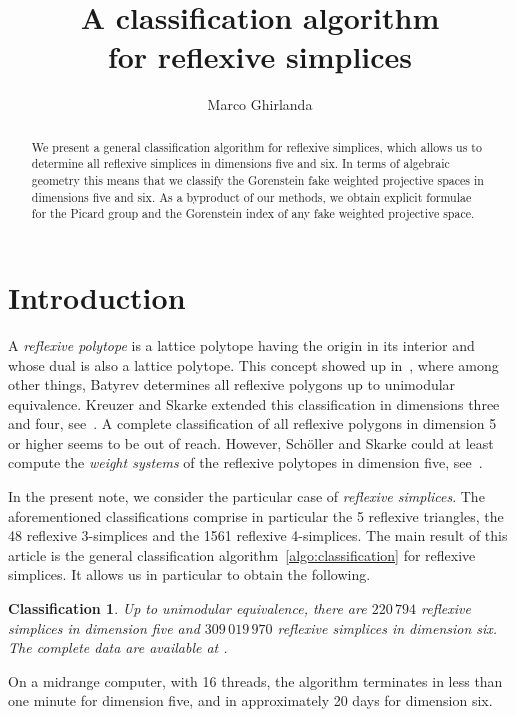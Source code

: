 \documentclass{amsart}
\title[A classification algorithm for reflexive simplices]{A classification algorithm\\ for reflexive simplices}
\author{Marco Ghirlanda}
\date{}
\newtheorem{classification}[lem]{Classification}
\theoremstyle{definition}
\begin{document}
\begin{abstract}
    We present a general classification algorithm for reflexive simplices,
    which allows us to determine all reflexive simplices in dimensions
    five and six.
    In terms of algebraic geometry this means that we classify the
    Gorenstein fake weighted projective spaces in dimensions five and six.
    As a byproduct of our methods, we obtain explicit formulae for the
    Picard group and the Gorenstein index of any fake weighted
    projective space.
\end{abstract}

\maketitle



\section{Introduction}

A \emph{reflexive polytope} is a lattice polytope having the origin
in its interior and whose dual is also a lattice polytope.
This concept showed up in~\cite{B}, where among other things,
Batyrev determines all reflexive polygons up to unimodular
equivalence.
Kreuzer and Skarke extended this classification in dimensions three
and four, see~\cites{KS3,KS4}. 
A complete classification of all reflexive polygons in dimension 5
or higher seems to be out of reach.
However, Sch\"oller and Skarke could at least compute the 
\emph{weight systems} of the reflexive polytopes in dimension
five, see~\cite{SS}.

In the present note, we consider the particular case of
\emph{reflexive simplices}.
The aforementioned classifications comprise in particular the
5 reflexive triangles, the 48 reflexive 3-simplices and the
1561 reflexive 4-simplices.
The main result of this article is the general classification
algorithm~\ref{algo:classification} for reflexive simplices.
It allows us in particular to obtain the following.

\begin{classification}\label{class:reflexive}
Up to unimodular equivalence, there are $220 \, 794$ reflexive simplices
in dimension five and $309 \, 019 \, 970$ reflexive simplices in dimension six.
The complete data are available at \cite{zenodo:17296449}.
\end{classification}

On a midrange computer, with 16 threads, the algorithm terminates
in less than one minute for dimension five, and in approximately
20 days for dimension six.
\end{document}
